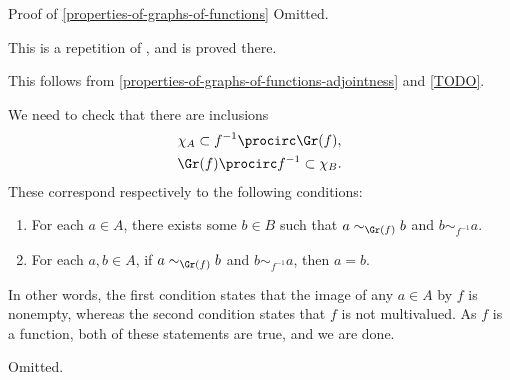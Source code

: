 \begin{Proof}{Proof of \cref{properties-of-graphs-of-functions}}%
    Omitted.

    This is a repetition of , and is proved there.

    This follows from \cref{properties-of-graphs-of-functions-adjointness} and \cref{TODO}.

    We need to check that there are inclusions
    \begin{gather*}
        \chi_{A}              \subset f^{-1}\procirc\Gr(f),\\
        \Gr(f)\procirc f^{-1} \subset \chi_{B}.
    \end{gather*}
    These correspond respectively to the following conditions:
    \begin{enumerate}
        \item\label{proof-of-properties-of-graphs-of-functions-adjointness-inside-sfbfrel-1}For each $a\in A$, there exists some $b\in B$ such that $a\sim_{\Gr(f)}b$ and $b\sim_{f^{-1}}a$.
        \item\label{proof-of-properties-of-graphs-of-functions-adjointness-inside-sfbfrel-2}For each $a,b\in A$, if $a\sim_{\Gr(f)}b$ and $b\sim_{f^{-1}}a$, then $a=b$.
    \end{enumerate}
    In other words, the first condition states that the image of any $a\in A$ by $f$ is nonempty, whereas the second condition states that $f$ is not multivalued. As $f$ is a function, both of these statements are true, and we are done.

    Omitted.


\end{Proof}
